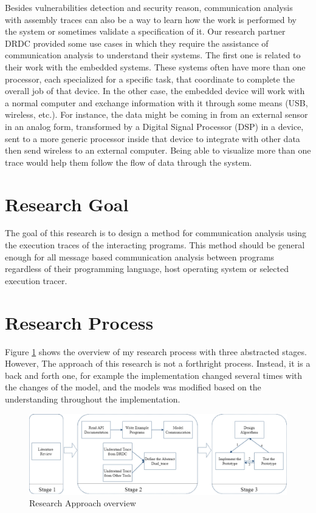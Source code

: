 Besides vulnerabilities detection and security reason, communication analysis with assembly traces can also be a way to learn how the work is performed by the system or sometimes validate a specification of it. Our research partner DRDC provided some use cases in which they require the assistance of communication analysis to understand their systems. The first one is related to their work with the embedded systems. These systems often have more than one processor, each specialized for a specific task, that coordinate to complete the overall job of that device.  In the other case, the embedded device will work with a normal computer and exchange information with it through some means
(USB, wireless, etc.).  For instance, the data might be coming in from an external sensor in an analog form, transformed by a Digital Signal Processor (DSP) in a device, sent to a more generic processor inside that device to integrate with other data then send wireless to an external computer. Being able to visualize more than one trace would help them follow the flow of data through the system.

\section{Research Goal}
The goal of this research is to design a method for communication analysis using the execution traces of the interacting programs. This method should be general enough for all message based communication analysis between programs regardless of their programming language, host operating system or selected execution tracer. 

\section{Research Process}
Figure \ref{methodology} shows the overview of my research process with three abstracted stages. However, The approach of this research is not a forthright process. Instead, it is a back and forth one, for example the implementation changed several times with the changes of the model, and the models was modified based on the understanding throughout the implementation. 

\begin{figure}[H]
  \centerline{\includegraphics[scale=0.45]{Figures/methodology}}
  \caption{Research Approach overview}
  \label{methodology}
  \end{figure}


